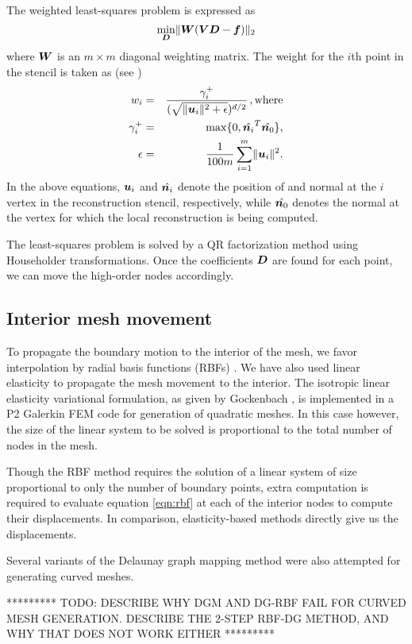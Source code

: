 The weighted least-squares problem is expressed as
\begin{equation}
\min_{\boldsymbol{D}} \lVert \boldsymbol{W}(\boldsymbol{V}\boldsymbol{D}-\boldsymbol{f})\rVert_2
\label{eq:sr_wls}
\end{equation}
where $\boldsymbol{W}$ is an $m \times m$ diagonal weighting matrix. The weight for the $i$th point in the stencil is taken as (see \cite{sr:diffquant})
\begin{eqnarray}
w_i &=& \frac{\gamma_i^+}{(\sqrt{\lVert\boldsymbol{u}_i\rVert^2 + \epsilon})^{d/2}} \, , \text{where} \\
\gamma_i^+ &=& \max\{0,\hat{\boldsymbol{n}_i}^ T\hat{\boldsymbol{n}_0}\}, \\
\epsilon &=& \frac{1}{100m} \sum_{i=1}^m \lVert\boldsymbol{u}_i \rVert^2.
\label{eq:sr_weight}
\end{eqnarray}
In the above equations, $\boldsymbol{u}_i$ and $\hat{\boldsymbol{n}_i}$ denote the position of and normal at the $i$ vertex in the reconstruction stencil, respectively, while $\hat{\boldsymbol{n}_0}$ denotes the normal at the vertex for which the local reconstruction is being computed.

The least-squares problem is solved by a QR factorization method using Householder transformations. Once the coefficients $\boldsymbol{D}$ are found for each point, we can move the high-order nodes accordingly.

\subsection{Interior mesh movement}

To propagate the boundary motion to the interior of the mesh, we favor interpolation by radial basis functions (RBFs) \cite{mm:rbf}. We have also used linear elasticity to propagate the mesh movement to the interior. The isotropic linear elasticity variational formulation, as given by Gockenbach \cite{gockenbach}, is implemented in a P2 Galerkin FEM code for generation of quadratic meshes. In this case however, the size of the linear system to be solved is proportional to the total number of nodes in the mesh.

Though the RBF method requires the solution of a linear system of size proportional to only the number of boundary points, extra computation is required to evaluate equation \eqref{eqn:rbf} at each of the interior nodes to compute their displacements. In comparison, elasticity-based methods directly give us the displacements.

Several variants of the Delaunay graph mapping method were also attempted for generating curved meshes.

********* TODO: DESCRIBE WHY DGM AND DG-RBF FAIL FOR CURVED MESH GENERATION. DESCRIBE THE 2-STEP RBF-DG METHOD, AND WHY THAT DOES NOT WORK EITHER *********


